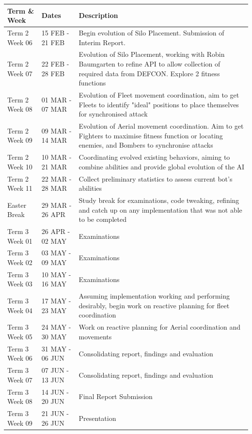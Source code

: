        
    \begin{center}
    \begin{tabular}{ | l | l | p{7cm}| }
    \hline
    \textbf{Term \& Week} & \textbf{Dates} & \textbf{Description} \\ \hline \hline
    Term 2 Week 06 & 15 FEB - 21 FEB & Begin evolution of Silo Placement. Submission of Interim Report. \\ \hline
    Term 2 Week 07 & 22 FEB - 28 FEB & Evolution of Silo Placement, working with Robin Baumgarten to refine API to allow collection of required data from DEFCON. Explore 2 fitness functions \\ \hline
    Term 2 Week 08 & 01 MAR - 07 MAR & Evolution of Fleet movement coordination, aim to get Fleets to identify "ideal" positions to place themselves for synchronised attack \\ \hline
      Term 2 Week 09 & 09 MAR - 14 MAR & Evolution of Aerial movement coordination. Aim to get Fighters to maximise fitness function or locating enemies, and Bombers to synchronise attacks \\ \hline
      Term 2 Week 10 & 10 MAR - 21 MAR & Coordinating evolved existing behaviors, aiming to combine abilities and provide global evolution of the AI \\ \hline
      Term 2 Week 11 & 22 MAR - 28 MAR & Collect preliminary statistics to assess current bot's abilities \\ \hline
      Easter Break & 29 MAR - 26 APR & Study break for examinations, code tweaking, refining and catch up on any implementation that was not able to be completed \\ \hline 
      Term 3 Week 01 & 26 APR - 02 MAY & Examinations \\ \hline
      Term 3 Week 02 & 03 MAY - 09 MAY & Examinations \\ \hline
      Term 3 Week 03 & 10 MAY - 16 MAY & Examinations \\ \hline
      Term 3 Week 04 & 17 MAY - 23 MAY & Assuming implementation working and performing desirably, begin work on reactive planning for fleet coordination \\ \hline
      Term 3 Week 05 & 24 MAY - 30 MAY & Work on reactive planning for Aerial coordination and movements \\ \hline
      Term 3 Week 06 & 31 MAY - 06 JUN & Consolidating report, findings and evaluation \\ \hline 
      Term 3 Week 07 & 07 JUN - 13 JUN & Consolidating report, findings and evaluation \\ \hline 
      Term 3 Week 08 & 14 JUN - 20 JUN & Final Report Submission \\ \hline
      Term 3 Week 09 & 21 JUN - 26 JUN & Presentation \\   
    \hline
    \end{tabular}
    \end{center}
    
    
      
    

